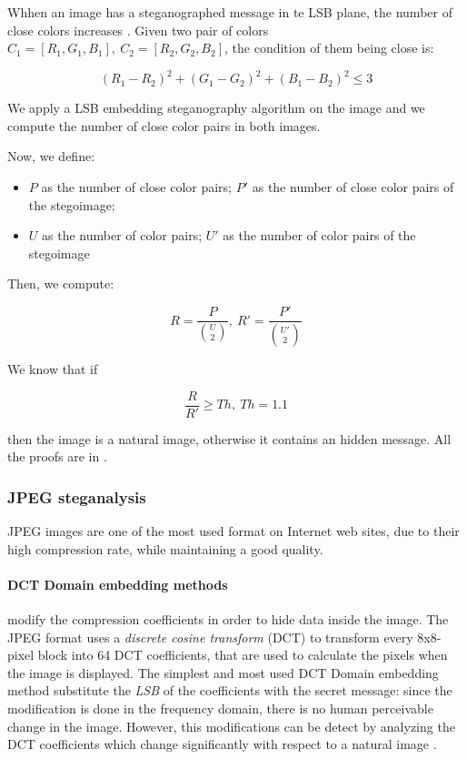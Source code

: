 \documentclass[../../main.tex]{subfiles}
\begin{document}
    Whhen an image has a steganographed message in te LSB plane, the number of
    close colors increases \cite{detecting-lsb-steganography}. Given two pair of
    colors $C_1=[R_1,G_1,B_1],\ C_2=[R_2,G_2,B_2]$, the condition of them being
    close is:

    \[ (R_1-R_2)^2+(G_1-G_2)^2+(B_1-B_2)^2 \leq 3 \]

    We apply a LSB embedding steganography algorithm on the image and we compute
    the number of close color pairs in both images.

    Now, we define:

    \begin{itemize}
        \item $P$ as the number of close color pairs; $P'$ as the number of
              close color pairs of the stegoimage;
        \item $U$ as the number of color pairs; $U'$ as the number of color
              pairs of the stegoimage
    \end{itemize}

    Then, we compute:

    \[ R = \frac{P}{\binom{U}{2}},\ R' = \frac{P'}{\binom{U'}{2}} \]

    We know that if

    \[ \frac{R}{R'} \geq Th,\ Th = 1.1 \]

    \noindent then the image is a natural image, otherwise it contains an hidden
    message. All the proofs are in \cite{detecting-lsb-steganography}.

    \subsubsection{JPEG steganalysis}
    JPEG images are one of the most used format on Internet web sites, due to
    their high compression rate, while maintaining a good quality.
    \paragraph{DCT Domain embedding methods} modify the compression coefficients
    in order to hide data inside the image.
    The JPEG format uses a \emph{discrete cosine transform} (DCT) to transform
    every 8x8-pixel block into 64 DCT coefficients, that are used to calculate
    the pixels when the image is displayed.
    The simplest and most used DCT Domain embedding method substitute the
    \emph{LSB} of the coefficients with the secret message: since the
    modification is done in the frequency domain, there is no human perceivable
    change in the image.
    However, this modifications can be detect by analyzing the DCT coefficients
    which change significantly with respect to a natural image
    \cite{jpeg-image-internet}.
\end{document}
